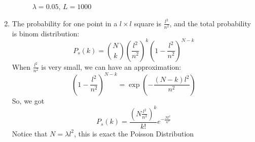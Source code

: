 \documentclass[11pt]{article}
\begin{document}
\begin{enumerate}
\begin{figure}
        \caption{$\lambda = 0.05$, $L = 1000$}
    \end{figure}
    \item 
    The probability for one point in a $l\times l$ square is $\frac{l^2}{n^2}$, and the total probability is binom distribution:
    $$
    P_s(k) = {N \choose k}(\frac{l^2}{n^2})^k(1-\frac{l^2}{n^2})^{N-k}
    $$
    When $\frac{l^2}{n^2}$ is very small, we can have an approximation:
    $$
    (1-\frac{l^2}{n^2})^{N-k}=\exp{(-\frac{(N-k)l^2}{n^2})}
    $$
    So, we got
    $$
    P_s(k) = \frac{(N\frac{l^2}{n^2})^k}{k!}e^{-\frac{Nl^2}{n^2}}
    $$
    Notice that $N=\lambda l^2$, this is exact the Poisson Distribution
\end{enumerate}
\end{document}
